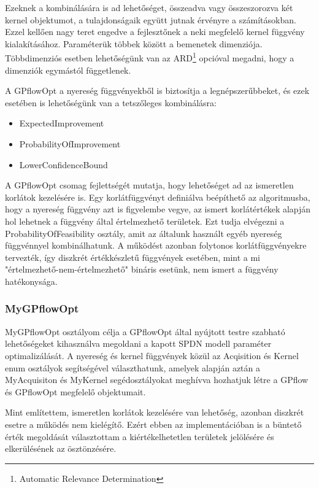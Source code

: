 Ezeknek a kombinálására is ad lehetőséget, összeadva vagy összeszorozva két kernel objektumot, a tulajdonságaik együtt jutnak érvényre a számításokban. Ezzel kellően nagy teret engedve a fejlesztőnek a neki megfelelő kernel függvény kialakításához. Paraméterük többek között a bemenetek dimenziója. Többdimenziós esetben lehetőségünk van az ARD\footnote{Automatic Relevance Determination} opcióval megadni, hogy a dimenziók egymástól függetlenek.

A GPflowOpt a nyereség függvényekből is biztosítja a legnépszerűbbeket, és ezek esetében is lehetőségünk van a tetszőleges kombinálásra:
\begin{itemize}
	\item ExpectedImprovement
	\item ProbabilityOfImprovement
	\item LowerConfidenceBound
\end{itemize}

A GPflowOpt csomag fejlettségét mutatja, hogy lehetőséget ad az ismeretlen korlátok kezelésére is. Egy korlátfüggvényt definiálva beépíthető az algoritmusba, hogy a nyereség függvény azt is figyelembe vegye, az ismert korlátértékek alapján hol lehetnek a függvény által értelmezhető területek. Ezt tudja elvégezni a ProbabilityOfFeasibility osztály, amit az általunk használt egyéb nyereség függvénnyel kombinálhatunk. A működést azonban folytonos korlátfüggvényekre tervezték, így diszkrét értékkészletű függvények esetében, mint a mi "értelmezhető-nem-értelmezhető" bináris esetünk, nem ismert a függvény hatékonysága.

\subsubsection{MyGPflowOpt}
MyGPflowOpt osztályom célja a GPflowOpt által nyújtott testre szabható lehetőségeket kihasználva megoldani a kapott SPDN modell paraméter optimalizálását. A nyereség és kernel függvények közül az Acqisition és Kernel enum osztályok segítségével választhatunk, amelyek alapján aztán a MyAcquisiton és MyKernel segédosztályokat meghívva hozhatjuk létre a GPflow és GPflowOpt megfelelő objektumait.


Mint említettem, ismeretlen korlátok kezelésére van lehetőség, azonban diszkrét esetre a működés nem kielégítő. Ezért ebben az implementációban is a büntető érték megoldását választottam a kiértékelhetetlen területek jelölésére és elkerülésének az ösztönzésére.

